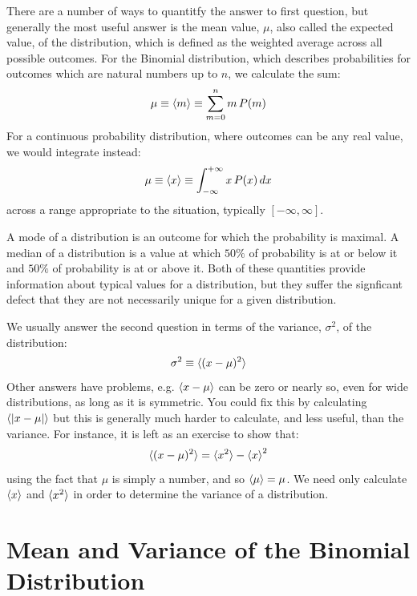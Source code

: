 \documentclass[12pt,oneside]{book}
\begin{document}
There are a number of ways to quantitfy the answer to first question,
but generally the most useful answer is the mean value, $\mu$, also called
the expected value, of the distribution, which is defined as the
weighted average across all possible outcomes.  For the Binomial distribution, which describes probabilities for outcomes which are natural numbers up to $n$, we calculate the sum:
\begin{equation}
\mu \equiv \braket{m} \equiv \sum_{m=0}^{n} m \, P(m)
\end{equation}
For a continuous probability distribution, where outcomes can be any
real value, we would integrate instead:
\begin{equation}
\mu \equiv \braket{x} \equiv \int_{-\infty}^{+\infty} x \, P(x) \, dx 
\end{equation}
across a range appropriate to the situation, typically $[-\infty,\infty]$.

A mode of a distribution is an outcome for which the probability is
maximal.  A median of a distribution is a value at which $50\%$ of
probability is at or below it and $50\%$ of probability is at or above
it.  Both of these quantities provide information about typical values
for a distribution, but they suffer the signficant defect that they
are not necessarily unique for a given distribution.

We usually answer the second question in terms of the variance, $\sigma^2$, of the distribution:
\begin{displaymath}
\sigma^2 \equiv \braket{(x-\mu)^2}
\end{displaymath}
Other answers have problems, e.g. $\braket{x-\mu}$ can be zero or nearly so, even for wide distributions, as long as it is symmetric.  You could fix this by calculating $\braket{|x-\mu|}$ but this is generally much harder to calculate, and less useful, than the variance.  For instance, it is left as an exercise to show that:
\begin{equation}
\label{eqn:varhw}
\braket{(x-\mu)^2} = \braket{x^2} -\braket{x}^2
\end{equation}
using the fact that $\mu$ is simply a number, and so $\braket{\mu} = \mu$.  We need only calculate $\braket{x}$ and $\braket{x^2}$ in order to determine the variance of a distribution.

\section{Mean and Variance of the Binomial Distribution}
\end{document}
